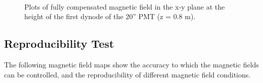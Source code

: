 %
%
\begin{figure}[htbp]
  \begin{center}
    \\
    \vspace{-3 mm}
  \caption{Plots of fully compensated magnetic field in the x-y plane at the height of the first dynode of the 20'' PMT (z = 0.8 m).}
  \label{fig:bfield_fullcomp800}
  \end{center}
\end{figure}
%


\subsection{Reproducibility Test}
\label{Appendix:ReproducibilityTest}

The following magnetic field maps show the accuracy to which the magnetic fields can be controlled, and the reproducibility of different magnetic field conditions.

